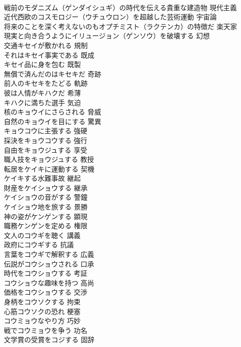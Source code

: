 \documentclass[8pt]{extreport}
\begin{document}
\begin{CJK}{UTF8}{min}
\\	戦前のモダニズム（ゲンダイシュギ）の時代を伝える貴重な建造物	現代主義
\\	近代西欧のコスモロジー（ウチュウロン）を超越した芸術運動	宇宙論
\\	将来のことを深く考えないのもオプチミスト（ラクテンカ）の特徴だ	楽天家
\\	現実と向き合うようにイリュージョン（ゲンソウ）を破壊する	幻想
\\	交通キセイが敷かれる	規制
\\	それはキセイ事実である	既成
\\	キセイ品に身を包む	既製
\\	無償で済んだのはキセキだ	奇跡
\\	前人のキセキをたどる	軌跡
\\	彼は人情がキハクだ	希薄
\\	キハクに満ちた選手	気迫
\\	核のキョウイにさらされる	脅威
\\	自然のキョウイを目にする	驚異
\\	キョウコウに主張する	強硬
\\	採決をキョウコウする	強行
\\	自由をキョウジュする	享受
\\	職人技をキョウジュする	教授
\\	転居をケイキに運動する	契機
\\	ケイキする水難事故	継起
\\	財産をケイショウする	継承
\\	ケイショウの音がする	警鐘
\\	ケイショウ地を旅する	景勝
\\	神の姿がケンゲンする	顕現
\\	職務ケンゲンを定める	権限
\\	文人のコウギを聴く	講義
\\	政府にコウギする	抗議
\\	言葉をコウギで解釈する	広義
\\	伝説がコウショウされる	口承
\\	時代をコウショウする	考証
\\	コウショウな趣味を持つ	高尚
\\	価格をコウショウする	交渉
\\	身柄をコウソクする	拘束
\\	心筋コウソクの恐れ	梗塞
\\	コウミョウなやり方	巧妙
\\	戦でコウミョウを争う	功名
\\	文学賞の受賞をコジする	固辞

\end{CJK}
\end{document}
